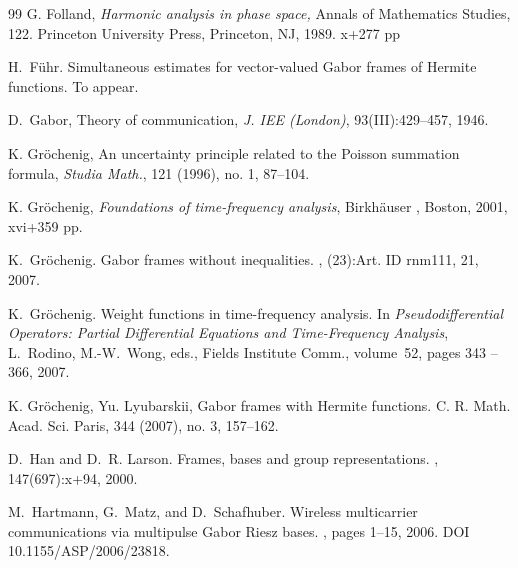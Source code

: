 \documentclass[12pt]{amsart}
\begin{document}
\begin{thebibliography}{99}
 G. Folland,  {\em  Harmonic analysis in phase space,} Annals of Mathematics Studies, 122. Princeton University Press, Princeton, NJ, 1989. x+277 pp



H.~F\"uhr.
\newblock Simultaneous estimates for vector-valued Gabor frames of Hermite
  functions.
\newblock To appear.


D.~Gabor,
  Theory of communication,
{\em J. IEE (London)}, 93(III):429--457, 1946.




 K. Gr\"ochenig,  An uncertainty principle related to the Poisson summation formula, {\em  Studia Math.},  121  (1996),  no. 1, 87--104. 

  K. Gr\"ochenig,  { \em Foundations of time-frequency analysis}, 
 Birkh\"auser ,   Boston,       2001,   xvi+359 pp. 



K.~Gr{\"o}chenig.
\newblock Gabor frames without inequalities.
, (23):Art. ID rnm111, 21, 2007.



K.~Gr\"ochenig.
\newblock Weight functions in time-frequency analysis.
\newblock In  {\em Pseudodifferential
  Operators: Partial Differential Equations and Time-Frequency
  Analysis},  L.~Rodino, M.-W.~Wong, eds.,
   Fields Institute Comm., volume~52, pages 343 -- 366,  2007.


 

 K. Gr\"ochenig, Yu. Lyubarskii,  Gabor frames with Hermite functions.  {C. R. Math. Acad. Sci. Paris},  344  (2007),  no. 3, 157--162.



D.~Han and D.~R. Larson.
\newblock Frames, bases and group representations.
, 147(697):x+94, 2000.

M.~Hartmann, G.~Matz, and D.~Schafhuber.
\newblock Wireless multicarrier communications via multipulse {G}abor {R}iesz
  bases.
, pages 1--15, 2006.
\newblock DOI 10.1155/ASP/2006/23818.



\end{thebibliography}
\end{document}
